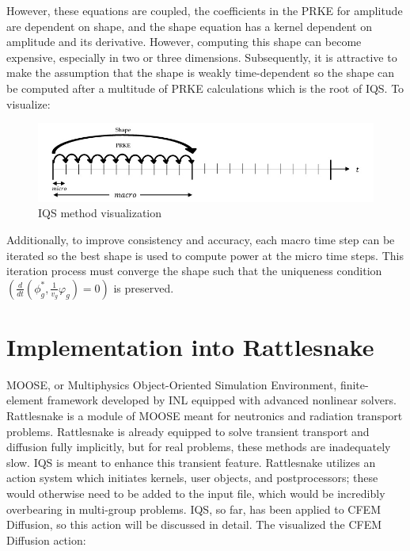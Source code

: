 \documentclass[11pt]{scrartcl}
\begin{document}
However, these equations are coupled, the coefficients in the PRKE for amplitude are dependent on shape, and the shape equation has a kernel dependent on amplitude and its derivative.  However, computing this shape can become expensive, especially in two or three dimensions.  Subsequently, it is attractive to make the assumption that the shape is weakly time-dependent so the shape can be computed after a multitude of PRKE calculations which is the root of IQS.  To visualize:
\begin{figure}[h]
\includegraphics[width=\linewidth]{IQS_visualization.jpg}
\caption{IQS method visualization}
\end{figure}
Additionally, to improve consistency and accuracy, each macro time step can be iterated so the best shape is used to compute power at the micro time steps.  This iteration process must converge the shape such that the uniqueness condition $(\frac{d}{dt}\left(\phi_g^*,\frac{1}{v_g}\varphi_g\right)=0)$ is preserved.

\newpage
\section{Implementation into Rattlesnake}
MOOSE, or Multiphysics Object-Oriented Simulation Environment, finite-element framework developed by INL equipped with advanced nonlinear solvers.  Rattlesnake is a module of MOOSE meant for neutronics and radiation transport problems.  Rattlesnake is already equipped to solve transient transport and diffusion fully implicitly, but for real problems, these methods are inadequately slow.  IQS is meant to enhance this transient feature.  Rattlesnake utilizes an action system which initiates kernels, user objects, and postprocessors; these would otherwise need to be added to the input file, which would be incredibly overbearing in multi-group problems.  IQS, so far, has been applied to CFEM Diffusion, so this action will be discussed in detail.  The visualized the CFEM Diffusion action: 
\end{document}
